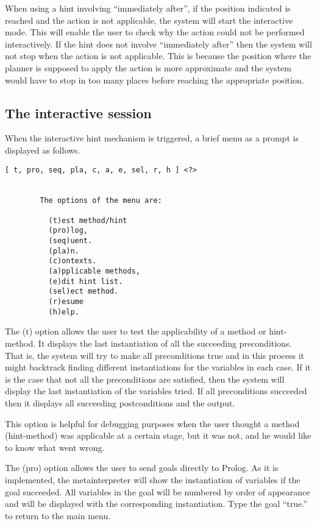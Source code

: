         When using a hint involving ``immediately after'', if the
position indicated is reached and the action is not applicable, the
system will start the interactive mode. This will enable the user to
check why the action could not be performed interactively. If the hint
does not involve ``immediately after'' then the system will not stop
when the action is not applicable. This is because the position where
the planner is supposed to apply the action is more approximate and
the system would have to stop in too many places before reaching the
appropriate position.

\subsection {The interactive session}


        When the interactive hint mechanism is triggered, a brief menu
as a prompt is displayed as follows.

\begin{verbatim}
[ t, pro, seq, pla, c, a, e, sel, r, h ] <?> 


        The options of the menu are:

          (t)est method/hint
          (pro)log,
          (seq)uent.
          (pla)n.
          (c)ontexts.
          (a)pplicable methods,
          (e)dit hint list.
          (sel)ect method.
          (r)esume
          (h)elp.

\end{verbatim}

        The (t) option allows the user to test the applicability of a
method or hint-method. It displays the last instantiation of all the
succeeding preconditions. That is, the system will try to make all
preconditions true and in this process it might backtrack finding different
instantiations for the variables in each case. If it is the case that not
all the preconditions are satisfied, then the system will display the last
instantiation of the variables tried. If all preconditions succeeded
then it displays all succeeding postconditions and the output.


        This option is helpful for debugging purposes when the user thought
a method (hint-method) was applicable at a certain stage, but it was not,
and he would like to know what went wrong.

        The (pro) option allows the user to send goals directly to
Prolog. As it is implemented, the metainterpreter will show the
instantiation of variables if the goal succeeded. All variables in the
goal will be numbered by order of appearance and will be displayed with
the corresponding instantiation. Type the goal ``true.'' to return to
the main menu.

